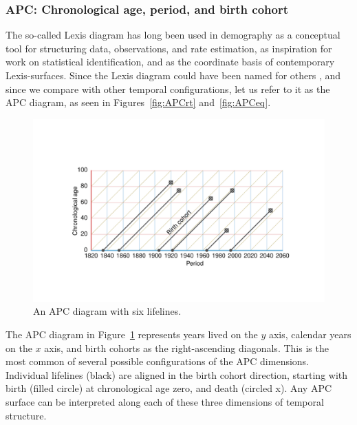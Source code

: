 \documentclass[12pt,oneside,a4paper]{article} %
\theoremstyle{definition}
\newcommand\tgh[1]{\raisebox{-.25\height}{\texttt{[image: Figures/triadtable/triad\#1.pdf]}}}
\begin{document}
\subsubsection{APC: Chronological age, period, and birth cohort}%
\label{sec:apc}
\FloatBarrier
The so-called Lexis diagram has long been used in demography as a conceptual
tool for structuring data, observations, and rate estimation, as inspiration for work
on statistical identification, and as the coordinate basis of contemporary
Lexis-surfaces. Since the Lexis diagram could have been named for others
\citep{keiding2011age, vandeschrick2001lexis}, and since we compare with other
temporal configurations, let us refer to it as the APC diagram, as seen in
Figures~\ref{fig:APCrt} and~\ref{fig:APCeq}. 

\begin{figure}[h!] 
\caption{An APC diagram with six lifelines.}
\label{fig:APC}
\centering
\vspace{-5em}
\includegraphics[scale=0.8]{Figures/APCrt.pdf}
\end{figure}

The APC diagram in Figure~\ref{fig:APC} represents years lived on the $y$
axis, calendar years on the $x$ axis, and birth cohorts as the right-ascending
diagonals. This is the most common of several possible configurations
of the APC dimensions. Individual lifelines (black) are aligned in the birth
cohort direction, starting with birth (filled circle) at chronological age zero, and death
(circled x). Any APC surface can be interpreted along each of these
three dimensions of temporal structure. 
\end{document}
